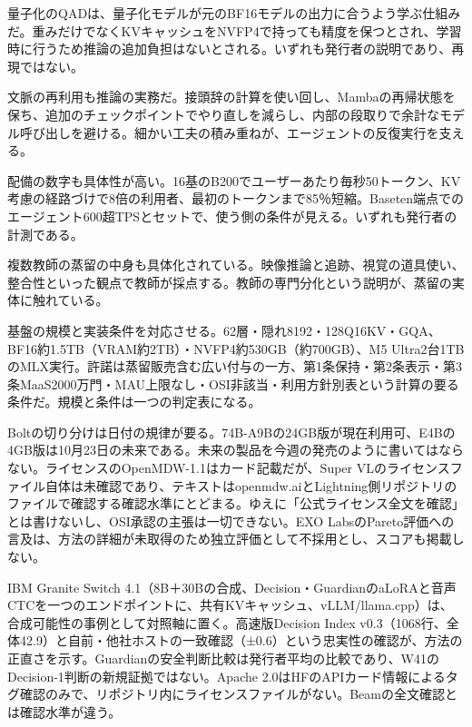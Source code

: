 \documentclass[lualatex,a4paper,10pt]{jlreq}
\begin{document}
量子化のQADは、量子化モデルが元のBF16モデルの出力に合うよう学ぶ仕組みだ。重みだけでなくKVキャッシュをNVFP4で持っても精度を保つとされ、学習時に行うため推論の追加負担はないとされる。いずれも発行者の説明であり、再現ではない。
\cite{B21,B72,B22,B20}


文脈の再利用も推論の実務だ。接頭辞の計算を使い回し、Mambaの再帰状態を保ち、追加のチェックポイントでやり直しを減らし、内部の段取りで余計なモデル呼び出しを避ける。細かい工夫の積み重ねが、エージェントの反復実行を支える。
\cite{B21,B72,B22,B20}


配備の数字も具体性が高い。16基のB200でユーザーあたり毎秒50トークン、KV考慮の経路づけで8倍の利用者、最初のトークンまで85％短縮。Baseten端点でのエージェント600超TPSとセットで、使う側の条件が見える。いずれも発行者の計測である。
\cite{B21,B72,B22,B20}


複数教師の蒸留の中身も具体化されている。映像推論と追跡、視覚の道具使い、整合性といった観点で教師が採点する。教師の専門分化という説明が、蒸留の実体に触れている。
\cite{B21,B72,B22,B20}


基盤の規模と実装条件を対応させる。62層・隠れ8192・128Q16KV・GQA、BF16約1.5TB（VRAM約2TB）・NVFP4約530GB（約700GB）、M5 Ultra2台1TBのMLX実行。許諾は蒸留販売含む広い付与の一方、第1条保持・第2条表示・第3条MaaS2000万門・MAU上限なし・OSI非該当・利用方針別表という計算の要る条件だ。規模と条件は一つの判定表になる。
\cite{B14,B70,B15,B13,B71}


Boltの切り分けは日付の規律が要る。74B-A9Bの24GB版が現在利用可、E4Bの4GB版は10月23日の未来である。未来の製品を今週の発売のように書いてはならない。ライセンスのOpenMDW-1.1はカード記載だが、Super VLのライセンスファイル自体は未確認であり、テキストはopenmdw.aiとLightning側リポジトリのファイルで確認する確認水準にとどまる。ゆえに「公式ライセンス全文を確認」とは書けないし、OSI承認の主張は一切できない。EXO LabsのPareto評価への言及は、方法の詳細が未取得のため独立評価として不採用とし、スコアも掲載しない。
\cite{B21,B72,B22,B20}


IBM Granite Switch 4.1（8B＋30Bの合成、Decision・GuardianのaLoRAと音声CTCを一つのエンドポイントに、共有KVキャッシュ、vLLM/llama.cpp）は、合成可能性の事例として対照軸に置く。高速版Decision Index v0.3（1068行、全体42.9）と自前・他社ホストの一致確認（±0.6）という忠実性の確認が、方法の正直さを示す。Guardianの安全判断比較は発行者平均の比較であり、W41のDecision-1判断の新規証拠ではない。Apache 2.0はHFのAPIカード情報によるタグ確認のみで、リポジトリ内にライセンスファイルがない。Beamの全文確認とは確認水準が違う。
\cite{B24,B73,B23,B25}
\end{document}
